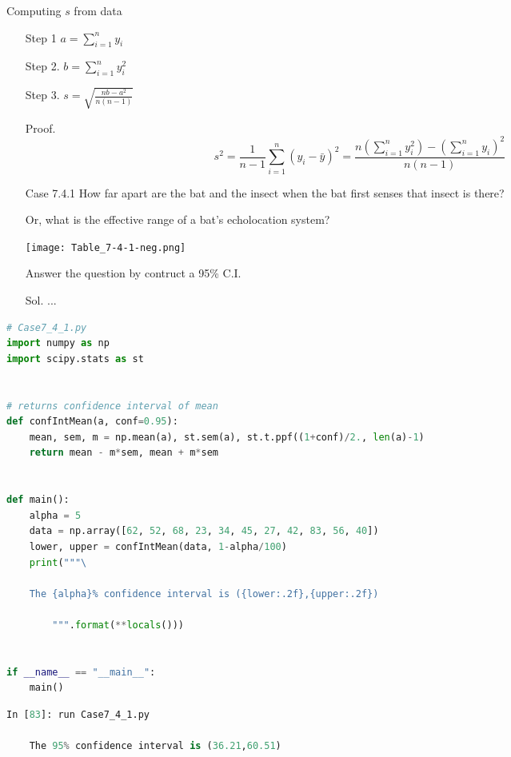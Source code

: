 \begin{frame}{Computing $s$ from data}
\begin{enumerate}
	\item[Step 1] $\displaystyle a=\sum_{i=1}^n y_i$
	\item[Step 2.] $\displaystyle b=\sum_{i=1}^n y_i^2$
	\item[Step 3.] $\displaystyle s =\sqrt{\frac{n b-a^2}{n(n-1)} } $
\vfill
\item[Proof.]\[
s^2 = \frac{1}{n-1}\sum_{i=1}^n (y_i-\bar{y})^2  =
\frac{n\left(\sum_{i=1}^n y_i^2\right) -\left(\sum_{i=1}^n y_i \right)^2}{n(n-1)}
\]
\myEnd
\end{enumerate}
\end{frame}
\begin{frame}
\begin{enumerate}
	\item[Case \small 7.4.1] How far apart are the bat and the insect when the bat first senses that insect is there? \\
	\item[] Or, what is the effective range of a bat's echolocation system?
		\begin{center}
		\texttt{[image: Table\_7-4-1-neg.png]}
		\end{center}
	\item[] Answer the question by contruct a 95\% C.I.
\vfill
\item[Sol.] ... \myEnd
\end{enumerate}
\end{frame}
\begin{frame}[fragile]
	\begin{lstlisting}[language=Python]
# Case7_4_1.py
import numpy as np
import scipy.stats as st


# returns confidence interval of mean
def confIntMean(a, conf=0.95):
    mean, sem, m = np.mean(a), st.sem(a), st.t.ppf((1+conf)/2., len(a)-1)
    return mean - m*sem, mean + m*sem


def main():
    alpha = 5
    data = np.array([62, 52, 68, 23, 34, 45, 27, 42, 83, 56, 40])
    lower, upper = confIntMean(data, 1-alpha/100)
    print("""\

    The {alpha}% confidence interval is ({lower:.2f},{upper:.2f})

        """.format(**locals()))


if __name__ == "__main__":
    main()
	\end{lstlisting}
	\begin{lstlisting}[language=Python]
In [83]: run Case7_4_1.py

    The 95% confidence interval is (36.21,60.51)


	\end{lstlisting}
\end{frame}

